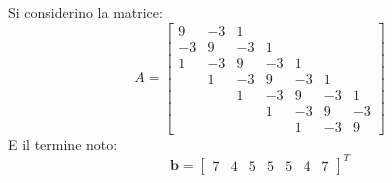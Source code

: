 Si considerino la matrice:
\begin{equation*}
    A = \begin{bmatrix}
        9 & -3 & 1 & & & & \\
        -3 & 9 & -3 & 1 & & & \\
        1 & -3 & 9 & -3 & 1 & & \\
        & 1 & -3 & 9 & -3 & 1 & \\
        && 1 & -3 & 9 & -3 & 1 \\
        &&& 1 & -3 & 9 & -3 \\
        &&&& 1 & -3 & 9 
    \end{bmatrix}
\end{equation*}
E il termine noto:
\begin{equation*}
    \mathbf{b} = \begin{bmatrix}
        7 & 4 & 5 & 5 & 5 & 4 & 7 
    \end{bmatrix}^{T}
\end{equation*}
